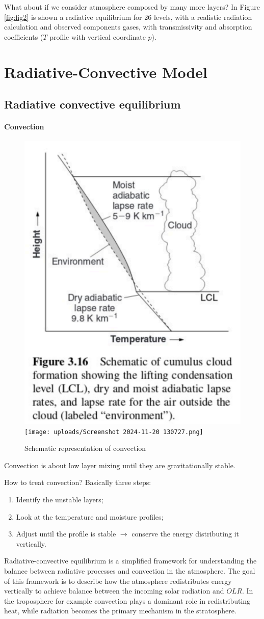 What about if we consider atmosphere composed by many more layers?
In Figure \ref{fig:fig2} is shown a radiative equilibrium for 26 levels, with a realistic radiation calculation and observed components gases, with transmissivity and absorption coefficients ($T$ profile with vertical coordinate $p$).

\section{Radiative-Convective Model}
\subsection{Radiative convective equilibrium}\label{subsec:convection adjustments}
\paragraph{Convection}
\begin{figure}[htpb]
	\centering
	\includegraphics[width=0.28\linewidth]{upload/Screenshot 2024-11-20 130640.png}\quad \texttt{[image: uploads/Screenshot 2024-11-20 130727.png]}
	\caption{Schematic representation of convection}

\end{figure}
Convection is about low layer mixing until they are gravitationally stable.

How to treat convection? Basically three steps:
\begin{enumerate}
	\item Identify the unstable layers;
	\item Look at the temperature and moisture profiles;
	\item Adjust until the profile is stable $\rightarrow$ conserve the energy distributing it vertically.
\end{enumerate}
Radiative-convective equilibrium is a simplified framework for understanding the balance between radiative processes and convection in the atmosphere. The goal of this framework is to describe how the atmosphere redistributes energy vertically to achieve balance between the incoming solar radiation and $OLR$. In the troposphere for example convection plays a dominant role in redistributing heat, while radiation becomes the primary mechanism in the stratosphere.


